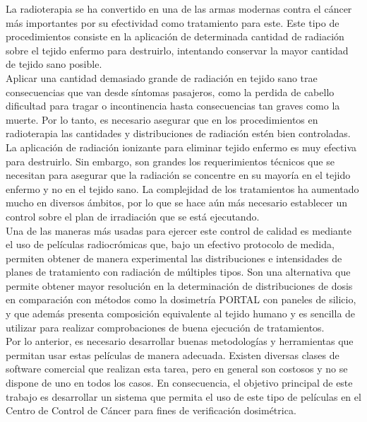 La radioterapia se ha convertido en una de las armas modernas contra el cáncer más importantes por su efectividad como tratamiento para este. Este tipo de procedimientos consiste en la aplicación de determinada cantidad de radiación sobre el tejido enfermo para destruirlo, intentando conservar la mayor cantidad de tejido sano posible.\\

Aplicar una cantidad demasiado grande de radiación en tejido sano trae consecuencias que van desde síntomas pasajeros, como la perdida de cabello dificultad para tragar o incontinencia hasta consecuencias tan graves como la muerte\cite{cancer.net_2020}.  Por lo tanto, es necesario asegurar que en los procedimientos en radioterapia las cantidades y distribuciones de radiación estén bien controladas.\\

La aplicación de radiación ionizante para eliminar tejido enfermo es muy efectiva para destruirlo. Sin embargo, son grandes los requerimientos técnicos que se necesitan para asegurar que la radiación se concentre en su mayoría en el tejido enfermo y no en el tejido sano. La complejidad de los tratamientos ha aumentado mucho en diversos ámbitos, por lo que se hace aún más necesario establecer un control sobre el plan de irradiación que se está ejecutando.\\

Una de las maneras más usadas para ejercer este control de calidad es mediante el uso de películas radiocrómicas que, bajo un efectivo protocolo de medida, permiten obtener de manera experimental las distribuciones e intensidades de planes de tratamiento con radiación de múltiples tipos. Son una alternativa que permite obtener mayor resolución en la determinación de distribuciones de dosis en comparación con métodos como la dosimetría PORTAL con paneles de silicio, y que además presenta composición equivalente al tejido humano y es sencilla de utilizar para realizar comprobaciones de buena ejecución de tratamientos. \\

Por lo anterior, es necesario desarrollar buenas metodologías y herramientas que permitan usar estas películas de manera adecuada. Existen diversas clases de software comercial que realizan esta tarea, pero en general son costosos y no se dispone de uno en todos los casos. En consecuencia, el objetivo principal de este trabajo es desarrollar un sistema que permita el uso de este tipo de películas en el Centro de Control de Cáncer para fines de verificación dosimétrica. 